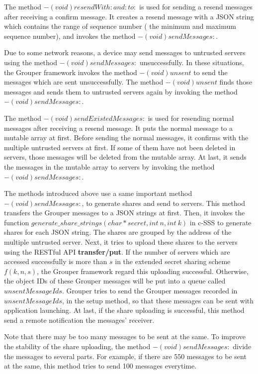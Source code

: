 \documentclass[a4paper,11pt]{report}
\begin{document}
The method $- (void)resendWith:and:to:$ is used for sending a resend messages after receiving a confirm message.
It creates a resend message with a JSON string which contains the range of sequence number ( the minimum and maximum sequence number), and invokes the method $- (void)sendMessages:$.

Due to some network reasons, a device may send messages to untrusted servers using the method $- (void)sendMessages:$ unsuccessfully.
In these situations, the Grouper framework invokes the method $- (void)unsent$ to send the messages which are sent unsuccessfully.
The method $- (void)unsent$ finds those messages and sends them to untrusted servers again by invoking the method $- (void)sendMessages:$.

The method $- (void)sendExistedMessages:$ is used for resending normal messages after receiving a resend message.
It puts the normal message to a mutable array at first.
Before sending the normal messages, it confirms with the multiple untrusted servers at first.
If some of them have not been deleted in servers, those messages will be deleted from the mutable array.
At last, it sends the messages in the mutable array to servers by invoking the method $- (void)sendMessages:$.

The methods introduced above use a same important method $- (void)sendMessages:$, to generate shares and send to servers.
This method transfers the Grouper messages to a JSON strings at first.
Then, it invokes the function $generate\_share\_strings(char * secret, int\ n, int\ k)$ in c-SSS\cite{c-sss} to generate shares for each JSON string.
The shares are grouped by the address of the multiple untrusted server.
Next, it tries to upload these shares to the servers using the RESTful API \textbf{transfer/put}.
If the number of servers which are accessed successfully is more than $s$ in the extended secret sharing scheme $f(k, n, s)$, the Grouper framework regard this uploading successful.
Otherwise, the object IDs of these Grouper messages will be put into a queue called $unsentMessageIds$.
Grouper tries to send the Grouper messages recorded in $unsentMessageIds$, in the setup method, so that these messages can be sent with application launching.
At last, if the share uploading is successful, this method send a remote notification the messages' receiver.

Note that there may be too many messages to be sent at the same.
To improve the stability of the share uploading, the method $- (void)sendMessages:$ divide the messages to several parts.
For example, if there are 550 messages to be sent at the same, this method tries to send 100 messages everytime.
\end{document}
